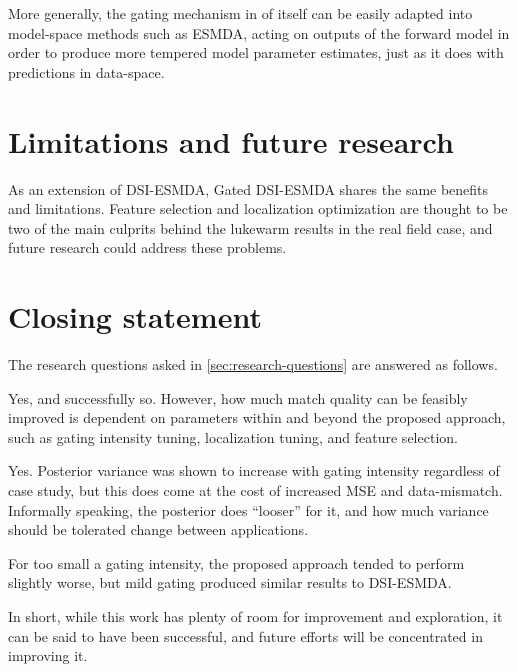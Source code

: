     More generally, the gating mechanism in of itself can be easily adapted into model-space methods such as ESMDA,
    acting on outputs of the forward model in order to produce more tempered model parameter estimates,
    just as it does with predictions in data-space.


\section{Limitations and future research}

As an extension of DSI-ESMDA, Gated DSI-ESMDA shares the same benefits and limitations.
Feature selection and localization optimization are thought to be two of the main culprits behind
the lukewarm results in the real field case, and future research could address these problems.

\section{Closing statement}
    The research questions asked in \cref{sec:research-questions} are answered as follows. 
    
    \medskip

    
    Yes, and successfully so. However, how much match quality can be feasibly improved is dependent on parameters within and beyond the proposed approach,
    such as gating intensity tuning, localization tuning, and feature selection. 

    \medskip

    
    Yes. Posterior variance was shown to increase with gating intensity regardless of case study, but this does come at the cost of increased MSE and data-mismatch. 
    Informally speaking, the posterior does ``looser'' for it, and how much variance should be tolerated change between applications. 

    \medskip
        
    
    For too small a gating intensity, the proposed approach tended to perform slightly worse,
    but mild gating produced similar results to DSI-ESMDA.

    \medskip

    In short, while this work has plenty of room for improvement and exploration, 
    it can be said to have been successful, and future efforts will be concentrated in improving it.